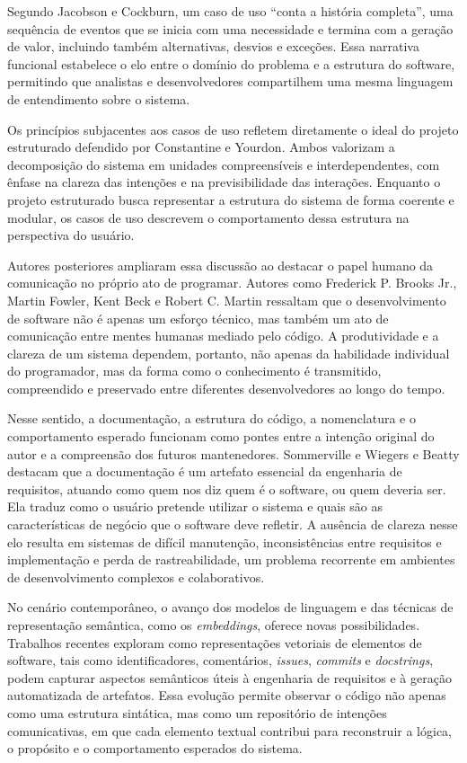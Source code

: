 \documentclass[12pt,a4paper]{article}
\begin{document}
Segundo Jacobson e Cockburn, um caso de uso “conta a história completa”, uma sequência de eventos que se inicia com uma necessidade e termina com a geração de valor, incluindo também alternativas, desvios e exceções. Essa narrativa funcional estabelece o elo entre o domínio do problema e a estrutura do software, permitindo que analistas e desenvolvedores compartilhem uma mesma linguagem de entendimento sobre o sistema.

Os princípios subjacentes aos casos de uso refletem diretamente o ideal do projeto estruturado defendido por Constantine e Yourdon. Ambos valorizam a decomposição do sistema em unidades compreensíveis e interdependentes, com ênfase na clareza das intenções e na previsibilidade das interações. Enquanto o projeto estruturado busca representar a estrutura do sistema de forma coerente e modular, os casos de uso descrevem o comportamento dessa estrutura na perspectiva do usuário.

Autores posteriores ampliaram essa discussão ao destacar o papel humano da comunicação no próprio ato de programar. Autores como Frederick P. Brooks Jr., Martin Fowler, Kent Beck e Robert C. Martin ressaltam que o desenvolvimento de software não é apenas um esforço técnico, mas também um ato de comunicação entre mentes humanas mediado pelo código. A produtividade e a clareza de um sistema dependem, portanto, não apenas da habilidade individual do programador, mas da forma como o conhecimento é transmitido, compreendido e preservado entre diferentes desenvolvedores ao longo do tempo.

Nesse sentido, a documentação, a estrutura do código, a nomenclatura e o comportamento esperado funcionam como pontes entre a intenção original do autor e a compreensão dos futuros mantenedores. Sommerville e Wiegers e Beatty  destacam que a documentação é um artefato essencial da engenharia de requisitos, atuando como quem nos diz quem é o software, ou quem deveria ser. Ela traduz como o usuário pretende utilizar o sistema e quais são as características de negócio que o software deve refletir. A ausência de clareza nesse elo resulta em sistemas de difícil manutenção, inconsistências entre requisitos e implementação e perda de rastreabilidade, um problema recorrente em ambientes de desenvolvimento complexos e colaborativos.

No cenário contemporâneo, o avanço dos modelos de linguagem e das técnicas de representação semântica, como os \textit{embeddings}, oferece novas possibilidades. Trabalhos recentes exploram como representações vetoriais de elementos de software, tais como identificadores, comentários, \textit{issues}, \textit{commits} e \textit{docstrings}, podem capturar aspectos semânticos úteis à engenharia de requisitos e à geração automatizada de artefatos. Essa evolução permite observar o código não apenas como uma estrutura sintática, mas como um repositório de intenções comunicativas, em que cada elemento textual contribui para reconstruir a lógica, o propósito e o comportamento esperados do sistema.
\end{document}
